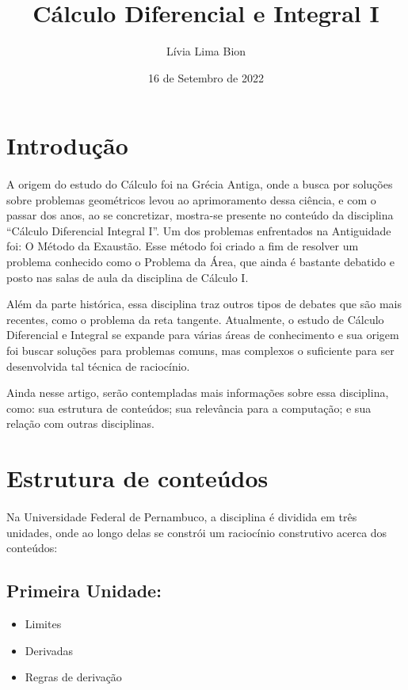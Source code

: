 \documentclass{article}
\title{Cálculo Diferencial e Integral I}
\author{Lívia Lima Bion }
\date{16 de Setembro de 2022}
\begin{document}
\maketitle

\section{Introdução}
\paragraph{}
A origem do estudo do Cálculo foi na Grécia Antiga, onde a busca por soluções sobre problemas geométricos levou ao aprimoramento dessa ciência, e com o passar dos anos, ao se concretizar, mostra-se presente no conteúdo da disciplina “Cálculo Diferencial Integral I”. Um dos problemas enfrentados na Antiguidade foi: O Método da Exaustão. Esse método foi criado a fim de resolver um problema conhecido como o Problema da Área, que ainda é bastante debatido e posto nas salas de aula da disciplina de Cálculo I. \cite{Matematica}

Além da parte histórica, essa disciplina traz outros tipos de debates que são mais recentes, como o problema da reta tangente. Atualmente, o estudo de Cálculo Diferencial e Integral se expande para várias áreas de conhecimento e sua origem foi buscar soluções para problemas comuns, mas complexos o suficiente para ser desenvolvida tal técnica de raciocínio. 

Ainda nesse artigo, serão contempladas mais informações sobre essa disciplina, como: sua estrutura de conteúdos; sua relevância para a computação; e sua relação com outras disciplinas.

\section{Estrutura de conteúdos}
\paragraph{}
Na Universidade Federal de Pernambuco, a disciplina é dividida em três unidades, onde ao longo delas se constrói um raciocínio construtivo acerca dos conteúdos:\cite{disciplina}

\subsection{Primeira Unidade:}
\begin{itemize}
\item Limites
\item Derivadas
\item Regras de derivação
\end{itemize}
\end{document}
